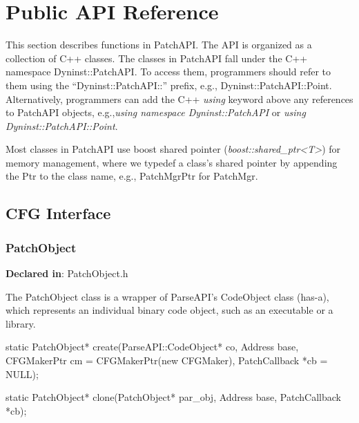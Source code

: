 \section{Public API Reference}
\label{sec-public-api}

This section describes functions in PatchAPI. The API is organized as a
collection of C++ classes. The classes in PatchAPI fall under the C++ namespace
Dyninst::PatchAPI. To access them, programmers should refer to them using the
``Dyninst::PatchAPI::'' prefix, e.g., Dyninst::PatchAPI::Point. Alternatively,
programmers can add the C++ \emph{using} keyword above any references to PatchAPI
objects, e.g.,\emph{using namespace Dyninst::PatchAPI} or \emph{using Dyninst::PatchAPI::Point}.

Most classes in PatchAPI use boost shared pointer (\emph{boost::shared\_ptr<T>}) for
memory management, where we typedef a class's shared pointer by appending the
Ptr to the class name, e.g., PatchMgrPtr for PatchMgr.

\subsection{CFG Interface}

\subsubsection{PatchObject}
\label{sec-3.2.8}

\textbf{Declared in}: PatchObject.h

The PatchObject class is a wrapper of ParseAPI's CodeObject class (has-a), which
represents an individual binary code object, such as an executable or a library.


\begin{apient}
static PatchObject* create(ParseAPI::CodeObject* co, Address base,
                           CFGMakerPtr cm = CFGMakerPtr(new CFGMaker),
                           PatchCallback *cb = NULL);
\end{apient}



\begin{apient}
static PatchObject* clone(PatchObject* par_obj, Address base, PatchCallback *cb);
\end{apient}


